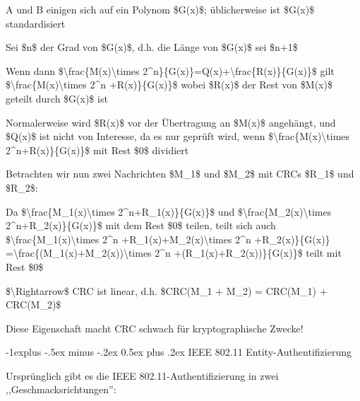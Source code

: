 \documentclass[a4paper]{article}
\makeatletter
\renewcommand{\subsection}{\@startsection{subsection}{2}{0mm}%
 {-1explus -.5ex minus -.2ex}%
 {0.5ex plus .2ex}%
 {\normalfont\normalsize\bfseries}}
\makeatother
\begin{document}
\begin{multicols}{3}
\begin{itemize*}
            \begin{itemize*}
                  \item A und B einigen sich auf ein Polynom \$G(x)\$; üblicherweise ist \$G(x)\$ standardisiert
                  \item Sei \$n\$ der Grad von \$G(x)\$, d.h. die Länge von \$G(x)\$ sei \$n+1\$
                  \item Wenn dann \$\textbackslash frac\{M(x)\textbackslash times 2\^{}n\}\{G(x)\}=Q(x)+\textbackslash frac\{R(x)\}\{G(x)\}\$ gilt \$\textbackslash frac\{M(x)\textbackslash times 2\^{}n +R(x)\}\{G(x)\}\$ wobei \$R(x)\$ der Rest von \$M(x)\$ geteilt durch \$G(x)\$ ist
                  \item Normalerweise wird \$R(x)\$ vor der Übertragung an \$M(x)\$ angehängt, und \$Q(x)\$ ist nicht von Interesse, da es nur geprüft wird, wenn \$\textbackslash frac\{M(x)\textbackslash times 2\^{}n+R(x)\}\{G(x)\}\$ mit Rest \$0\$ dividiert
            \end{itemize*}
            \item
            Betrachten wir nun zwei Nachrichten \$M\_1\$ und \$M\_2\$ mit CRCs
            \$R\_1\$ und \$R\_2\$:

            \begin{itemize*}
                  \item Da \$\textbackslash frac\{M\_1(x)\textbackslash times 2\^{}n+R\_1(x)\}\{G(x)\}\$ und \$\textbackslash frac\{M\_2(x)\textbackslash times 2\^{}n+R\_2(x)\}\{G(x)\}\$ mit dem Rest \$0\$ teilen, teilt sich auch \$\textbackslash frac\{M\_1(x)\textbackslash times 2\^{}n +R\_1(x)+M\_2(x)\textbackslash times 2\^{}n +R\_2(x)\}\{G(x)\} =\textbackslash frac\{(M\_1(x)+M\_2(x))\textbackslash times 2\^{}n +(R\_1(x)+R\_2(x))\}\{G(x)\}\$ teilt mit Rest \$0\$
                  \item \$\textbackslash Rightarrow\$ CRC ist linear, d.h. \$CRC(M\_1 + M\_2) = CRC(M\_1) + CRC(M\_2)\$
            \end{itemize*}
            \item
            Diese Eigenschaft macht CRC schwach für kryptographische Zwecke!
      \end{itemize*}


      \subsection{IEEE 802.11
            Entity-Authentifizierung}

      \begin{itemize*}
            \item
            Ursprünglich gibt es die IEEE 802.11-Authentifizierung in zwei
            ,,Geschmacksrichtungen'':


\end{itemize*}
\end{multicols}
\end{document}
